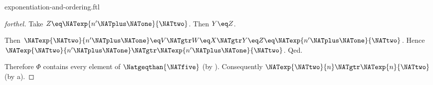 \documentclass{naproche-library}
\begin{document}
\begin{smodule}[title=Exponentiation and Ordering]{exponentiation-and-ordering.ftl}
\begin{proof}[forthel]
    Take $Z \eq \NATexp{n' \NATplus \NATone}{\NATtwo}$.
    Then $Y \eq Z$.

    Then $\NATexp{\NATtwo}{n' \NATplus \NATone} \eq V \NATgtr W \eq X \NATgtr Y \eq Z \eq \NATexp{n' \NATplus \NATone}{\NATtwo}$.
    Hence $\NATexp{\NATtwo}{n' \NATplus \NATone} \NATgtr \NATexp{n' \NATplus \NATone}{\NATtwo}$.
  Qed.

  Therefore $\Phi$ contains every element of $\Natgeqthan{\NATfive}$ (by ).
  Consequently $\NATexp{\NATtwo}{n} \NATgtr \NATexp{n}{\NATtwo}$ (by a).
\end{proof}
\end{smodule}
\end{document}
